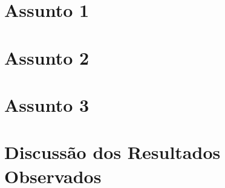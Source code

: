 \section{Assunto 1}
\preencheComTexto

\section{Assunto 2}
\preencheComTexto

\section{Assunto 3}
\preencheComTexto

\section{Discussão dos Resultados Observados}
\preencheComTexto





